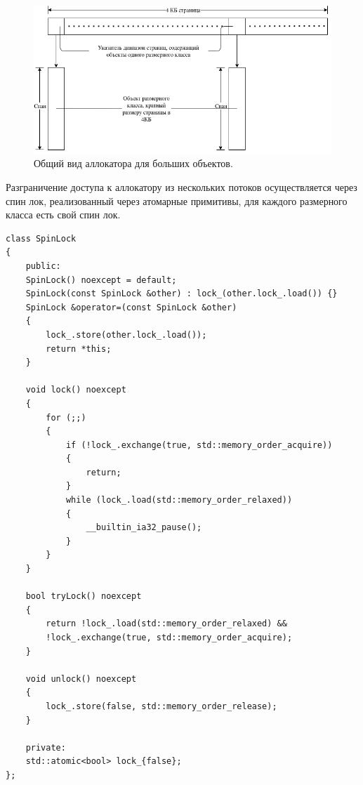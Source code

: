 \begin{figure}[!h]
	\begin{center}
		\includegraphics[scale=0.6]{images/large-allocator-design.png}
		\caption{Общий вид аллокатора для больших объектов.}
		\label{large-allocator-design}
	\end{center}
\end{figure}

Разграничение доступа к аллокатору из нескольких потоков осуществляется через спин лок\cite{spinlock}, реализованный через атомарные примитивы, для каждого размерного класса есть свой спин лок.

\begin{lstlisting}
class SpinLock
{
	public:
	SpinLock() noexcept = default;
	SpinLock(const SpinLock &other) : lock_(other.lock_.load()) {}
	SpinLock &operator=(const SpinLock &other)
	{
		lock_.store(other.lock_.load());
		return *this;
	}
	
	void lock() noexcept
	{
		for (;;)
		{
			if (!lock_.exchange(true, std::memory_order_acquire))
			{
				return;
			}
			while (lock_.load(std::memory_order_relaxed))
			{
				__builtin_ia32_pause();
			}
		}
	}
	
	bool tryLock() noexcept
	{
		return !lock_.load(std::memory_order_relaxed) &&
		!lock_.exchange(true, std::memory_order_acquire);
	}
	
	void unlock() noexcept
	{
		lock_.store(false, std::memory_order_release);
	}
	
	private:
	std::atomic<bool> lock_{false};
};
\end{lstlisting}

